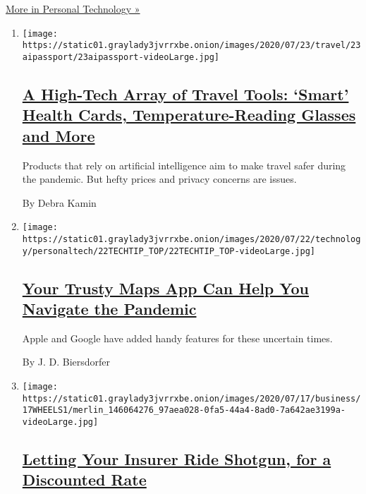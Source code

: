 \href{/section/technology/personaltech}{More in Personal Technology »}

\begin{enumerate}
\def\labelenumi{\arabic{enumi}.}
\item
  \texttt{[image: https://static01.graylady3jvrrxbe.onion/images/2020/07/23/travel/23aipassport/23aipassport-videoLarge.jpg]}

  \hypertarget{a-high-tech-array-of-travel-tools-smart-health-cards-temperature-reading-glasses-and-more}{%
  \subsection{\texorpdfstring{\href{/2020/07/23/travel/artificial-intelligence-coronavirus-passport.html}{A
  High-Tech Array of Travel Tools: `Smart' Health Cards,
  Temperature-Reading Glasses and
  More}}{A High-Tech Array of Travel Tools: `Smart' Health Cards, Temperature-Reading Glasses and More}}\label{a-high-tech-array-of-travel-tools-smart-health-cards-temperature-reading-glasses-and-more}}

  Products that rely on artificial intelligence aim to make travel safer
  during the pandemic. But hefty prices and privacy concerns are issues.

  By Debra Kamin
\item
  \texttt{[image: https://static01.graylady3jvrrxbe.onion/images/2020/07/22/technology/personaltech/22TECHTIP\_TOP/22TECHTIP\_TOP-videoLarge.jpg]}

  \hypertarget{your-trusty-maps-app-can-help-you-navigate-the-pandemic}{%
  \subsection{\texorpdfstring{\href{/2020/07/22/technology/personaltech/maps-apps-coronavirus-pandemic.html}{Your
  Trusty Maps App Can Help You Navigate the
  Pandemic}}{Your Trusty Maps App Can Help You Navigate the Pandemic}}\label{your-trusty-maps-app-can-help-you-navigate-the-pandemic}}

  Apple and Google have added handy features for these uncertain times.

  By J. D. Biersdorfer
\item
  \texttt{[image: https://static01.graylady3jvrrxbe.onion/images/2020/07/17/business/17WHEELS1/merlin\_146064276\_97aea028-0fa5-44a4-8ad0-7a642ae3199a-videoLarge.jpg]}

  \hypertarget{letting-your-insurer-ride-shotgun-for-a-discounted-rate}{%
  \subsection{\texorpdfstring{\href{/2020/07/16/business/car-insurance-app-discounts.html}{Letting
  Your Insurer Ride Shotgun, for a Discounted
  Rate}}{Letting Your Insurer Ride Shotgun, for a Discounted Rate}}\label{letting-your-insurer-ride-shotgun-for-a-discounted-rate}}


\end{enumerate}
